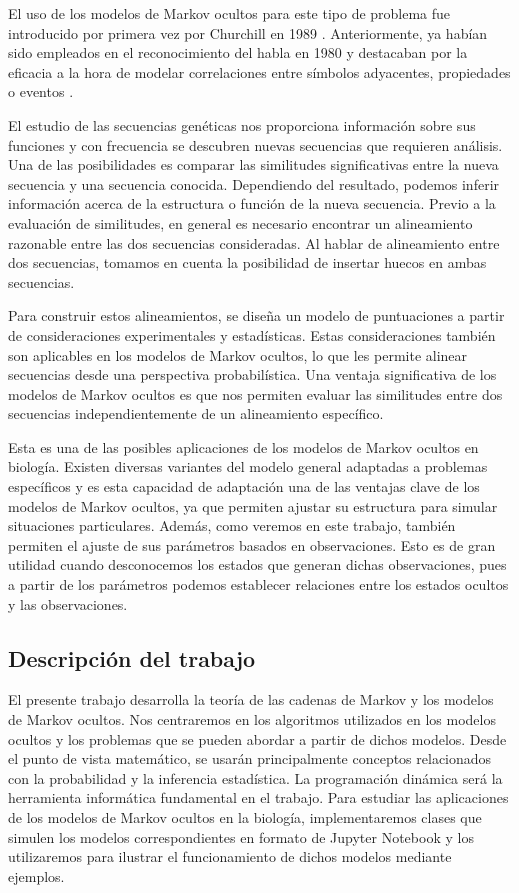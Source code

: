 El uso de los modelos de Markov ocultos para este tipo de problema fue introducido por primera vez por Churchill en 1989 \cite{Churchill}. Anteriormente, ya habían sido empleados en el reconocimiento del habla en 1980 \cite{Ferguson} y destacaban por la eficacia a la hora de modelar correlaciones entre símbolos adyacentes, propiedades o eventos \cite{Rabiner}. 

El estudio de las secuencias genéticas nos proporciona información sobre sus funciones y con frecuencia se descubren nuevas secuencias que requieren análisis. Una de las posibilidades es comparar las similitudes significativas entre la nueva secuencia y una secuencia conocida. Dependiendo del resultado, podemos inferir información acerca de la estructura o función de la nueva secuencia. Previo a la evaluación de similitudes, en general es necesario encontrar un alineamiento razonable entre las dos secuencias consideradas. Al hablar de alineamiento entre dos secuencias, tomamos en cuenta la posibilidad de insertar huecos en ambas secuencias. 

Para construir estos alineamientos, se diseña un modelo de puntuaciones a partir de consideraciones experimentales y estadísticas. Estas consideraciones también son aplicables en los modelos de Markov ocultos, lo que les permite alinear secuencias desde una perspectiva probabilística. Una ventaja significativa de los modelos de Markov ocultos es que nos permiten evaluar las similitudes entre dos secuencias independientemente de un alineamiento específico.

Esta es una de las posibles aplicaciones de los modelos de Markov ocultos en biología. Existen diversas variantes del modelo general adaptadas a problemas específicos y es esta capacidad de adaptación una de las ventajas clave de los modelos de Markov ocultos, ya que permiten ajustar su estructura para simular situaciones particulares. Además, como veremos en este trabajo, también permiten el ajuste de sus parámetros basados en observaciones. Esto es de gran utilidad cuando desconocemos los estados que generan dichas observaciones, pues a partir de los parámetros podemos establecer relaciones entre los estados ocultos y las observaciones.

\subsection*{Descripción del trabajo}
El presente trabajo desarrolla la teoría de las cadenas de Markov y los modelos de Markov ocultos. Nos centraremos en los algoritmos utilizados en los modelos ocultos y los problemas que se pueden abordar a partir de dichos modelos. Desde el punto de vista matemático, se usarán principalmente conceptos relacionados con la probabilidad y la inferencia estadística. La programación dinámica será la herramienta informática fundamental en el trabajo. Para estudiar las aplicaciones de los modelos de Markov ocultos en la biología, implementaremos clases que simulen los modelos correspondientes en formato de Jupyter Notebook y los utilizaremos para ilustrar el funcionamiento de dichos modelos mediante ejemplos.    

